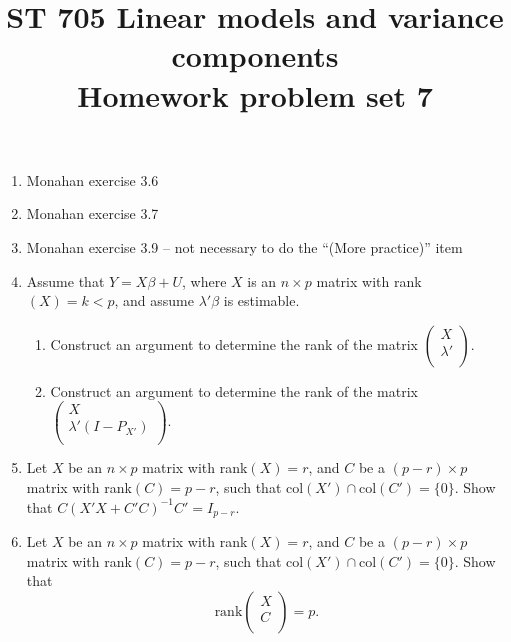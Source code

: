 \documentclass[11pt]{article}
\title{ST 705 Linear models and variance components \\ 
        Homework problem set 7}
\begin{document}
\maketitle

\begin{enumerate}

\item Monahan exercise 3.6

\item Monahan exercise 3.7

\item Monahan exercise 3.9 -- not necessary to do the ``(More practice)'' item

\item Assume that $Y = X\beta + U$, where $X$ is an $n\times p$ matrix with rank$(X) = k < p$, and assume $\lambda'\beta$ is estimable.
\begin{enumerate}
\item Construct an argument to determine the rank of the matrix 
$
\begin{pmatrix}
X \\
\lambda' \\
\end{pmatrix}
$.
\item Construct an argument to determine the rank of the matrix  
$
\begin{pmatrix}
X \\
\lambda'(I - P_{X'}) \\
\end{pmatrix}
$.
\end{enumerate}

\item  Let $X$ be an $n\times p$ matrix with rank$(X) = r$, and $C$ be a $(p-r)\times p$ matrix with rank$(C) = p-r$, such that col$(X') \cap \text{col}(C') = \{0\}$.  Show that $C(X'X + C'C)^{-1}C' = I_{p-r}$.

\item Let $X$ be an $n\times p$ matrix with rank$(X) = r$, and $C$ be a $(p-r)\times p$ matrix with rank$(C) = p-r$, such that col$(X') \cap \text{col}(C') = \{0\}$.  Show that 
\[
\text{rank}
\begin{pmatrix}
X \\
C \\
\end{pmatrix} = p.
\]


\end{enumerate}
\end{document}
